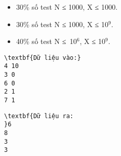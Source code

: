 \begin{itemize}
	\item 30\% số test N ≤ 1000, X ≤ 1000.
	\item 30\% số test N ≤ 1000, X ≤ 10$^9$.
	\item 40\% số test N ≤ 10$^6$, X ≤ 10$^9$.
\end{itemize}
\begin{verbatim}
\textbf{Dữ liệu vào:}
4 10
3 0
6 0
2 1
7 1\end{verbatim}
\begin{verbatim}
\textbf{Dữ liệu ra:
}6
8
3
3\end{verbatim}

 